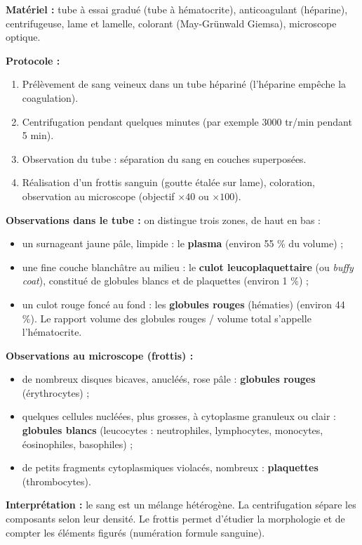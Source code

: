 \documentclass[11pt]{article}
\newcommand{\cle}[1]{{\popxbold\color{popdark}#1}}
\begin{document}
\begin{experience}
\textbf{Matériel :} tube à essai gradué (tube à hématocrite), anticoagulant (héparine), centrifugeuse, lame et lamelle, colorant (May-Grünwald Giemsa), microscope optique.

\textbf{Protocole :}
\begin{enumerate}
    \item Prélèvement de sang veineux dans un tube hépariné (l'héparine empêche la coagulation).
    \item Centrifugation pendant quelques minutes (par exemple 3000 tr/min pendant 5 min).
    \item Observation du tube : séparation du sang en couches superposées.
    \item Réalisation d'un frottis sanguin (goutte étalée sur lame), coloration, observation au microscope (objectif $\times 40$ ou $\times 100$).
\end{enumerate}

\textbf{Observations dans le tube :} on distingue trois zones, de haut en bas :
\begin{itemize}
    \item un surnageant jaune pâle, limpide : le \textbf{plasma} (environ 55 \% du volume) ;
    \item une fine couche blanchâtre au milieu : le \textbf{culot leucoplaquettaire} (ou \emph{buffy coat}), constitué de globules blancs et de plaquettes (environ 1 \%) ;
    \item un culot rouge foncé au fond : les \textbf{globules rouges} (hématies) (environ 44 \%). Le rapport volume des globules rouges / volume total s'appelle l'\cle{hématocrite}.
\end{itemize}

\textbf{Observations au microscope (frottis) :}
\begin{itemize}
    \item de nombreux disques bicaves, anucléés, rose pâle : \textbf{globules rouges} (érythrocytes) ;
    \item quelques cellules nucléées, plus grosses, à cytoplasme granuleux ou clair : \textbf{globules blancs} (leucocytes : neutrophiles, lymphocytes, monocytes, éosinophiles, basophiles) ;
    \item de petits fragments cytoplasmiques violacés, nombreux : \textbf{plaquettes} (thrombocytes).
\end{itemize}

\textbf{Interprétation :} le sang est un mélange hétérogène. La centrifugation sépare les composants selon leur densité. Le frottis permet d'étudier la morphologie et de compter les éléments figurés (numération formule sanguine).
\end{experience}
\end{document}
